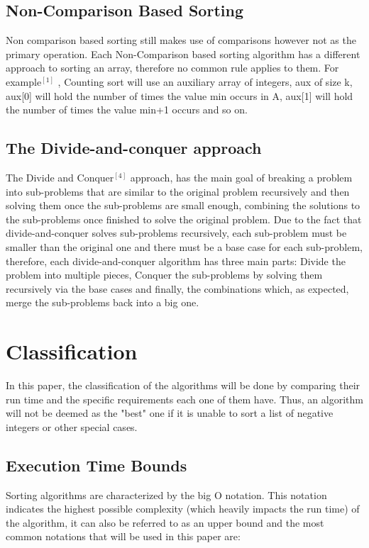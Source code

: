 \documentclass{article}
\begin{document}
\subsection{Non-Comparison Based Sorting}
Non comparison based sorting still makes use of comparisons however not as the primary operation. Each Non-Comparison based sorting algorithm has a different approach to sorting an array, therefore no common rule applies to them. For example$^{[1]}$ , Counting sort will use an auxiliary array of integers, aux of size k, aux[0] will hold the number of times the value min occurs in A, aux[1] will hold the number of times the value min+1 occurs and so on.

\subsection{The Divide-and-conquer approach}
The Divide and Conquer$^{[4]}$ approach, has the main goal of breaking a problem into sub-problems that are similar to the original problem recursively and then solving them once the sub-problems are small enough, combining the solutions to the sub-problems once finished to solve the original problem. Due to the fact that divide-and-conquer solves sub-problems recursively, each sub-problem must be smaller than the original one and there must be a base case for each sub-problem, therefore, each divide-and-conquer algorithm has three main parts: Divide the problem into multiple pieces, Conquer the sub-problems by solving them recursively via the base cases and finally, the combinations which, as expected, merge the sub-problems back into a big one.

\section{Classification}
In this paper, the classification of the algorithms will be done by comparing their run time and the specific requirements each one of them have. Thus, an algorithm will not be deemed as the "best" one if it is unable to sort a list of negative integers or other special cases.

\subsection{Execution Time Bounds}
Sorting algorithms are characterized by the big O notation. This notation indicates the highest possible complexity (which heavily impacts the run time) of the algorithm, it can also be referred to as an upper bound and the most common notations that will be used in this paper are:
\end{document}
